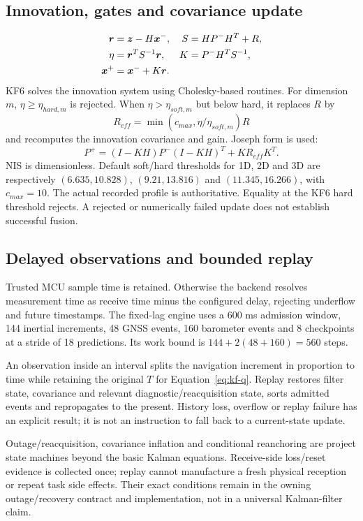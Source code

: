 \subsection{Innovation, gates and covariance update}
\begin{align}
\boldsymbol{r}&=\boldsymbol{z}-H\boldsymbol{x}^-,&S&=HP^-H^T+R,\\
\eta&=\boldsymbol{r}^TS^{-1}\boldsymbol{r},&K&=P^-H^TS^{-1},\\
\boldsymbol{x}^+&=\boldsymbol{x}^-+K\boldsymbol{r}.
\end{align}
KF6 solves the innovation system using Cholesky-based routines. For dimension $m$, $\eta\ge\eta_{hard,m}$ is rejected. When $\eta>\eta_{soft,m}$ but below hard, it replaces $R$ by
\begin{equation}
R_{eff}=\min(c_{max},\eta/\eta_{soft,m})R
\end{equation}
and recomputes the innovation covariance and gain. Joseph form is used:
\begin{equation}
P^+=(I-KH)P^-(I-KH)^T+KR_{eff}K^T.
\label{eq:joseph}
\end{equation}
NIS is dimensionless. Default soft/hard thresholds for 1D, 2D and 3D are respectively $(6.635,10.828)$, $(9.21,13.816)$ and $(11.345,16.266)$, with $c_{max}=10$. The actual recorded profile is authoritative. Equality at the KF6 hard threshold rejects. A rejected or numerically failed update does not establish successful fusion.

\subsection{Delayed observations and bounded replay}
Trusted MCU sample time is retained. Otherwise the backend resolves measurement time as receive time minus the configured delay, rejecting underflow and future timestamps. The fixed-lag engine uses a 600 ms admission window, 144 inertial increments, 48 GNSS events, 160 barometer events and 8 checkpoints at a stride of 18 predictions. Its work bound is $144+2(48+160)=560$ steps.

An observation inside an interval splits the navigation increment in proportion to time while retaining the original $T$ for Equation~\eqref{eq:kf-q}. Replay restores filter state, covariance and relevant diagnostic/reacquisition state, sorts admitted events and repropagates to the present. History loss, overflow or replay failure has an explicit result; it is not an instruction to fall back to a current-state update.

Outage/reacquisition, covariance inflation and conditional reanchoring are project state machines beyond the basic Kalman equations. Receive-side loss/reset evidence is collected once; replay cannot manufacture a fresh physical reception or repeat task side effects. Their exact conditions remain in the owning outage/recovery contract and implementation, not in a universal Kalman-filter claim.

